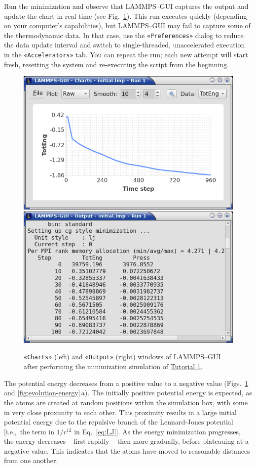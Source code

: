 \documentclass[9pt,tutorial]{livecoms}
\newcommand{\guicmd}[1]{\textcolor{command}{\texttt{«#1»}}} %
\begin{document}
Run the minimization and observe that LAMMPS--GUI captures the output
and update the chart in real time (see Fig.~\ref{fig:chart-log}).  This run executes quickly (depending
on your computer's capabilities), but LAMMPS--GUI may fail to capture some
of the thermodynamic data.  In that
case, use the \guicmd{Preferences} dialog to reduce the data update
interval and switch to single-threaded, unaccelerated execution in the
\guicmd{Accelerators} tab.  You can repeat the run; each new attempt will start
fresh, resetting the system and re-executing the script from the beginning.

\begin{figure}
\centering
\includegraphics[width=0.49\linewidth]{chart-1}
\includegraphics[width=0.497\linewidth]{output-1}
\caption{\guicmd{Charts} (left) and \guicmd{Output} (right) windows of LAMMPS--GUI
  after performing the minimization simulation of \hyperref[lennard-jones-label]{Tutorial 1}.}
\label{fig:chart-log}
\end{figure}

The potential energy decreases from a positive value to a
negative value (Figs.~\ref{fig:chart-log} and \ref{fig:evolution-energy}\,a).
The initially positive potential energy is
expected, as the atoms are created at random positions within
the simulation box, with some in very close proximity to each other.
This proximity results in a large initial potential energy due to the repulsive branch of the
Lennard-Jones potential [i.e.,~the term in $1/r^{12}$ in Eq.~\eqref{eq:LJ}].
As the energy minimization progresses, the
energy decreases -- first rapidly -- then more gradually,
before plateauing at a negative value.  This indicates that the atoms
have moved to reasonable distances from one another.
\end{document}
